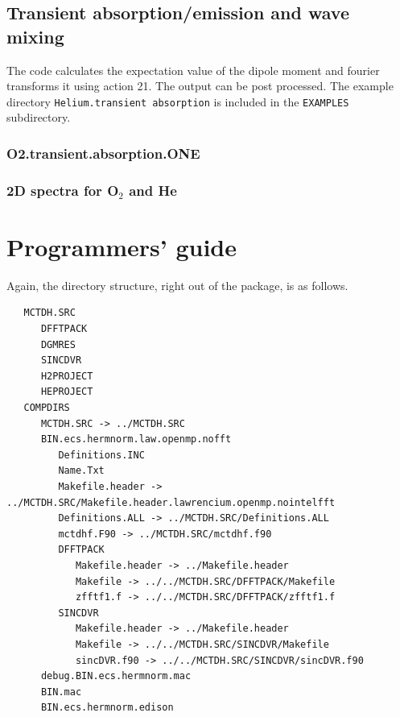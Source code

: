 \documentclass[10pt,leqno, oneside]{book}
\begin{document}
\section{Transient absorption/emission and wave mixing}

The code calculates the expectation value of the dipole moment and fourier transforms it using action 21.  The output can be post
processed.  The example directory
\verb#Helium.transient absorption#
is included in the \verb#EXAMPLES# subdirectory.  

\subsection{O2.transient.absorption.ONE}

\subsection{2D spectra for O$_2$ and He}



\chapter{Programmers' guide}


Again, the directory structure, right out of the package, is as follows. 

{\footnotesize
\begin{verbatim}
   MCTDH.SRC
      DFFTPACK
      DGMRES
      SINCDVR
      H2PROJECT
      HEPROJECT
   COMPDIRS
      MCTDH.SRC -> ../MCTDH.SRC
      BIN.ecs.hermnorm.law.openmp.nofft
         Definitions.INC
         Name.Txt
         Makefile.header -> ../MCTDH.SRC/Makefile.header.lawrencium.openmp.nointelfft
         Definitions.ALL -> ../MCTDH.SRC/Definitions.ALL
         mctdhf.F90 -> ../MCTDH.SRC/mctdhf.f90
         DFFTPACK
            Makefile.header -> ../Makefile.header
            Makefile -> ../../MCTDH.SRC/DFFTPACK/Makefile
            zfftf1.f -> ../../MCTDH.SRC/DFFTPACK/zfftf1.f
         SINCDVR
            Makefile.header -> ../Makefile.header
            Makefile -> ../../MCTDH.SRC/SINCDVR/Makefile
            sincDVR.f90 -> ../../MCTDH.SRC/SINCDVR/sincDVR.f90
      debug.BIN.ecs.hermnorm.mac
      BIN.mac
      BIN.ecs.hermnorm.edison
\end{verbatim}}
\end{document}
